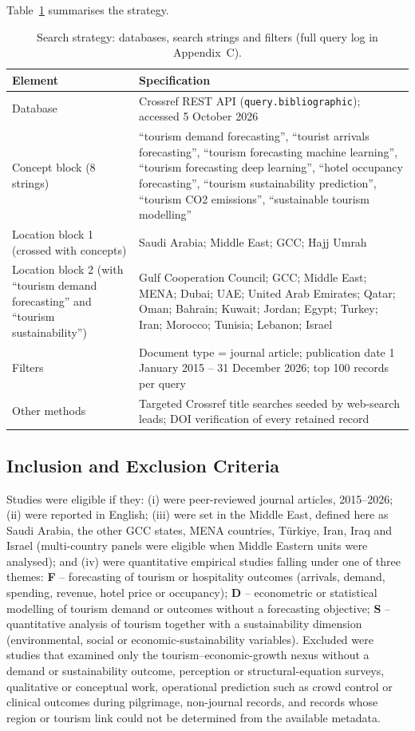 \documentclass[11pt,a4paper]{article}
\begin{document}
Table~\ref{tab:strings} summarises the strategy.

\begin{table}[t]\centering\small
\caption{Search strategy: databases, search strings and filters (full query log in Appendix~C).}\label{tab:strings}
\begin{tabularx}{\linewidth}{@{}p{3.1cm}X@{}}
\toprule
Element & Specification\\
\midrule
Database & Crossref REST API (\texttt{query.bibliographic}); accessed 5 October 2026\\
Concept block (8 strings) & ``tourism demand forecasting'', ``tourist arrivals forecasting'', ``tourism forecasting machine learning'', ``tourism forecasting deep learning'', ``hotel occupancy forecasting'', ``tourism sustainability prediction'', ``tourism CO2 emissions'', ``sustainable tourism modelling''\\
Location block 1 (crossed with concepts) & Saudi Arabia; Middle East; GCC; Hajj Umrah\\
Location block 2 (with ``tourism demand forecasting'' and ``tourism sustainability'') & Gulf Cooperation Council; GCC; Middle East; MENA; Dubai; UAE; United Arab Emirates; Qatar; Oman; Bahrain; Kuwait; Jordan; Egypt; Turkey; Iran; Morocco; Tunisia; Lebanon; Israel\\
Filters & Document type = journal article; publication date 1 January 2015 -- 31 December 2026; top 100 records per query\\
Other methods & Targeted Crossref title searches seeded by web-search leads; DOI verification of every retained record\\
\bottomrule
\end{tabularx}
\end{table}

\subsection{Inclusion and Exclusion Criteria}
Studies were eligible if they: (i) were peer-reviewed journal articles, 2015--2026; (ii) were reported in English; (iii) were set in the Middle East, defined here as Saudi Arabia, the other GCC states, MENA countries, T\"urkiye, Iran, Iraq and Israel (multi-country panels were eligible when Middle Eastern units were analysed); and (iv) were quantitative empirical studies falling under one of three themes: \textbf{F} -- forecasting of tourism or hospitality outcomes (arrivals, demand, spending, revenue, hotel price or occupancy); \textbf{D} -- econometric or statistical modelling of tourism demand or outcomes without a forecasting objective; \textbf{S} -- quantitative analysis of tourism together with a sustainability dimension (environmental, social or economic-sustainability variables). Excluded were studies that examined only the tourism--economic-growth nexus without a demand or sustainability outcome, perception or structural-equation surveys, qualitative or conceptual work, operational prediction such as crowd control or clinical outcomes during pilgrimage, non-journal records, and records whose region or tourism link could not be determined from the available metadata.
\end{document}
